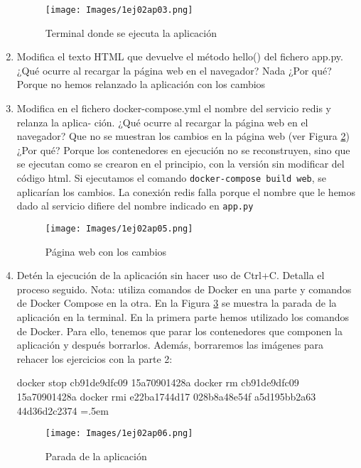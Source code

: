 \documentclass[12pt,a4paper]{article}
\newenvironment{lcverbatim}
 {\SaveVerbatim{cverb}}
 {\endSaveVerbatim
  \flushleft\fboxrule=0pt\fboxsep=.5em
  \colorbox{cverbbg}{%
    \makebox[\dimexpr\linewidth-2\fboxsep][l]{\BUseVerbatim{cverb}}%
  }
  \endflushleft
}
\begin{document}
\begin{enumerate}
\begin{figure}[h]
    \centering
    \texttt{[image: Images/1ej02ap03.png]}
    \caption{Terminal donde se ejecuta la aplicación}
    \label{fig:1ej02ap03}
\end{figure}

\item Modifica el texto HTML que devuelve el método hello() del fichero app.py. ¿Qué ocurre al
recargar la página web en el navegador? Nada ¿Por qué? Porque no hemos relanzado la aplicación con los cambios


\item Modifica en el fichero docker-compose.yml el nombre del servicio redis y relanza la aplica-
ción. ¿Qué ocurre al recargar la página web en el navegador? Que no se muestran los cambios en la página web (ver Figura \ref{fig:1ej02ap05}) ¿Por qué? Porque los contenedores en ejecución no se reconstruyen, sino que se ejecutan como se crearon en el principio, con la versión sin modificar del código html. Si ejecutamos el comando \verb|docker-compose build web|, se aplicarían los cambios. La conexión redis falla porque el nombre que le hemos dado al servicio difiere del nombre indicado en \verb|app.py|

\begin{figure}[h]
    \centering
    \texttt{[image: Images/1ej02ap05.png]}
    \caption{Página web con los cambios}
    \label{fig:1ej02ap05}
\end{figure}

\item Detén la ejecución de la aplicación sin hacer uso de Ctrl+C. Detalla el proceso seguido. Nota:
utiliza comandos de Docker en una parte y comandos de Docker Compose en la otra. En la Figura \ref{fig:1ej02ap06} se muestra la parada de la aplicación en la terminal. En la primera parte hemos utilizado los comandos de Docker. Para ello, tenemos que parar los contenedores que componen la aplicación y después borrarlos. Además, borraremos las imágenes para rehacer los ejercicios con la parte 2:

\begin{lcverbatim}
docker stop cb91de9dfc09 15a70901428a
docker rm cb91de9dfc09 15a70901428a
docker rmi e22ba1744d17 028b8a48e54f a5d195bb2a63 44d36d2c2374
\end{lcverbatim}

\begin{figure}[h]
    \centering
    \texttt{[image: Images/1ej02ap06.png]}
    \caption{Parada de la aplicación}
    \label{fig:1ej02ap06}
\end{figure}

\end{enumerate}{}
\end{document}
